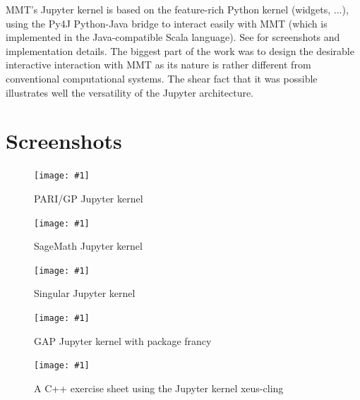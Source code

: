 \documentclass{deliverablereport}
\begin{document}
MMT's Jupyter kernel is based on the feature-rich Python kernel
(widgets, ...), using the Py4J Python-Java bridge to interact easily
with MMT (which is implemented in the Java-compatible Scala language). See
 for screenshots and implementation
details. The biggest part of the work was to design the desirable interactive
interaction with MMT as its nature is rather different from
conventional computational systems. The shear fact that it was
possible illustrates well the versatility of the Jupyter architecture.

\clearpage
\appendix
\section{Screenshots}
\newcommand{\screenshot}[2]{
\begin{figure}[ht]
  \texttt{[image: \#1]}
  \caption{#2}
\end{figure}}

\screenshot{pari.png}{PARI/GP Jupyter kernel}
\screenshot{sage.png}{SageMath Jupyter kernel}
\screenshot{singular_new.png}{Singular Jupyter kernel}
\clearpage
\screenshot{gap.png}{GAP Jupyter kernel with package francy}
\clearpage
\screenshot{cling-teaching.png}{A C++ exercise sheet using the Jupyter kernel xeus-cling}
\end{document}
